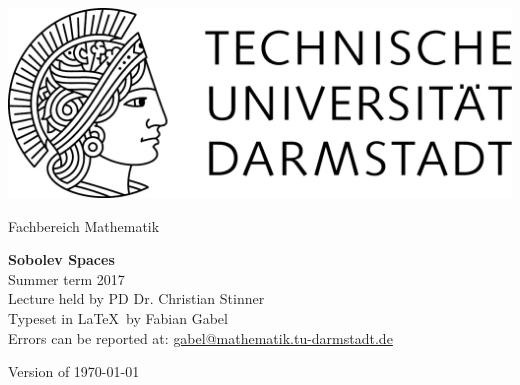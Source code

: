 \documentclass[11pt,a4paper,leqno]{report}
\begin{document}
\hypersetup{pageanchor=false}
\begin{titlepage}
  \begin{center}
    \vspace{1cm}
    \includegraphics[width=0.5\linewidth]{TU_Darmstadt_Logo.pdf}
    \vspace{1cm}
    
    \large{Fachbereich Mathematik}
    \vspace{3.5cm}
    
    \Huge{\textbf{Sobolev Spaces}\\}
    \vspace*{0.5cm}    
    \Large{{Summer term 2017}\\}
    \vspace*{0.5cm}    
    \small{Lecture held by PD Dr. Christian Stinner\\}
    \vspace*{1.0cm}
    \small{Typeset in \LaTeX\ by Fabian Gabel\\}
    \small{Errors can be reported at: \url{gabel@mathematik.tu-darmstadt.de}}

    \vspace*{\fill}
    \small{Version of \today}
  \end{center}
\end{titlepage}

\hypersetup{pageanchor=true}
\tableofcontents









\end{document}
